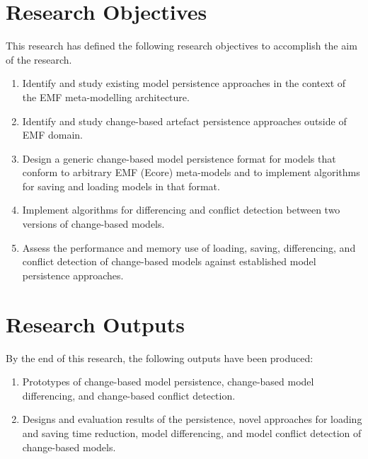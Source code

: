 \section{Research Objectives}
\label{sec:research_objectives}
This research has defined the following research objectives to accomplish the aim of the research.
\begin{enumerate}
  \item Identify and study existing model persistence approaches in the context of the EMF meta-modelling architecture.  
  \item Identify and study change-based artefact persistence approaches outside of EMF domain.
  \item Design a generic change-based model persistence format for models that conform to arbitrary EMF (Ecore) meta-models and to implement algorithms for saving and loading models in that format.
  \item Implement algorithms for differencing and conflict detection between two versions of change-based models.
  \item Assess the performance and memory use of loading, saving, differencing, and conflict detection of change-based models against established model persistence approaches. 
\end{enumerate}

\section{Research Outputs}
\label{sec:research_outputs}
By the end of this research, the following outputs have been produced:
\begin{enumerate}
  \item Prototypes of change-based model persistence, change-based model differencing, and change-based conflict detection.
  \item Designs and evaluation results of the persistence, novel approaches for loading and saving time reduction, model differencing, and model conflict detection of change-based models.
\end{enumerate}

